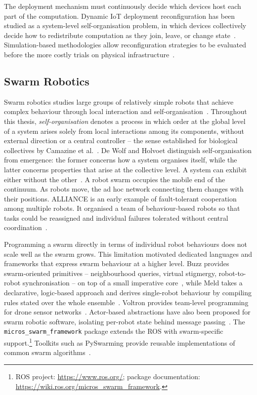 The deployment mechanism must continuously decide which devices host each part of the computation.
%
Dynamic \ac{IoT} deployment reconfiguration has been studied as a system-level self-organisation problem,
in which devices collectively decide how to redistribute computation as they join,
leave,
or change state~\cite{DBLP:journals/iot/FarabegoliPCV24}.
%
Simulation-based methodologies allow reconfiguration strategies to be evaluated before the more costly trials on physical infrastructure~\cite{DBLP:journals/iotj/CasadeiFPPSV22}.

\subsection{Swarm Robotics}
\label{subsec:swarm-robotics}

Swarm robotics studies large groups of relatively simple robots that achieve complex behaviour through local interaction and self-organisation~\cite{DBLP:journals/swarm/BrambillaFBD13,DBLP:journals/sensors/DiasSFVCP21}.
%
Throughout this thesis, \emph{self-organisation} denotes a process in which order at the global level of a system arises solely from local interactions among its components,
without external direction or a central controller --
the sense established for biological collectives by Camazine et al.~\cite{DBLP:books/daglib/0032897}.
%
De Wolf and Holvoet distinguish self-organisation from emergence:
the former concerns how a system organises itself,
while the latter concerns properties that arise at the collective level.
A system can exhibit either without the other~\cite{DBLP:conf/atal/WolfH04}.
%
A robot swarm occupies the mobile end of the continuum.
As robots move, the ad hoc network connecting them changes with their positions.
%
ALLIANCE is an early example of fault-tolerant cooperation among multiple robots.
It organised a team of behaviour-based robots so that tasks could be reassigned and individual failures tolerated without central coordination~\cite{parker1998alliance}.

Programming a swarm directly in terms of individual robot behaviours does not scale well as the swarm grows.
This limitation motivated dedicated languages and frameworks that express swarm behaviour at a higher level.
%
Buzz provides swarm-oriented primitives -- neighbourhood queries,
virtual stigmergy,
robot-to-robot synchronisation -- on top of a small imperative core~\cite{buzz-robot},
while Meld takes a declarative, logic-based approach and derives single-robot behaviour by compiling rules stated over the whole ensemble~\cite{meld-robot}.
%
Voltron provides team-level programming for drone sensor networks~\cite{voltron-robot}.
Actor-based abstractions have also been proposed for swarm robotic software,
isolating per-robot state behind message passing~\cite{DBLP:conf/iros/YiDLD0WY20}.
%
The \texttt{micros\_swarm\_framework} package extends the \ac{ROS} with swarm-specific support.\footnote{ROS project: \url{https://www.ros.org/}; package documentation: \url{https://wiki.ros.org/micros_swarm_framework}.}
Toolkits such as PySwarming provide reusable implementations of common swarm algorithms~\cite{DBLP:journals/jossw/AndradeFS23}.

